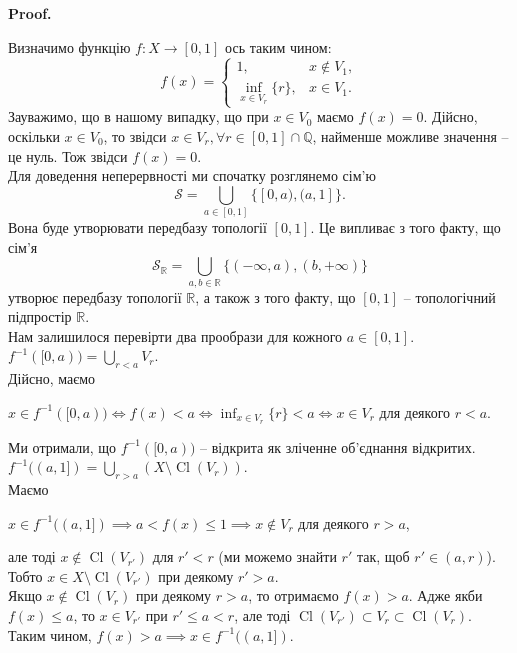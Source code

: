 \documentclass[a4paper, 10pt]{article}
\makeatletter
\theoremstyle{theoremdd}
\DeclareMathOperator{\Cl}{Cl}
\renewenvironment{proof}[1][Proof.\\]{\par
\pushQED{\hfill \qed}%
\normalfont \topsep6\p@\@plus6\p@\relax
\trivlist
\item\relax
{\bfseries
#1\@addpunct{.}}\hspace\labelsep\ignorespaces
}{%
\popQED\endtrivlist\@endpefalse
}
\makeatother
\begin{document}
\begin{proof}
Визначимо функцію $f \colon X \to [0,1]$ ось таким чином: 
\[
f(x) = \begin{cases} 1, & x \notin V_1, \\ \displaystyle\inf_{x \in V_r} \{r\}, & x \in V_1. \end{cases}
\]
Зауважимо, що в нашому випадку, що при $x \in V_0$ маємо $f(x) = 0$. Дійсно, оскільки $x \in V_0$, то звідси $x \in V_r, \forall r \in [0,1] \cap \mathbb{Q}$, найменше можливе значення -- це нуль. Тож звідси $f(x) = 0$.\\
Для доведення неперервності ми спочатку розглянемо сім'ю
\[ 
\mathcal{S} = \displaystyle\bigcup_{a \in [0,1]} \{ [0,a), (a,1] \}.
\]
Вона буде утворювати передбазу топології $[0,1]$. Це випливає з того факту, що сім'я 
\[
\mathcal{S}_{\mathbb{R}} = \displaystyle\bigcup_{a,b \in \mathbb{R}} \{(-\infty,a), (b,+\infty)\}
\] 
утворює передбазу топології $\mathbb{R}$, а також з того факту, що $[0,1]$ -- топологічний підпростір $\mathbb{R}$.\\
Нам залишилося перевірти два прообрази для кожного $a \in [0,1]$.
\bigskip \\
$f^{-1}([0,a)) = \displaystyle\bigcup_{r < a} V_r$. \\
Дійсно, маємо
\begin{center}
$x \in f^{-1}([0,a)) \iff f(x) < a \iff \displaystyle\inf_{x \in V_r} \{r\} < a \iff x \in V_r$ для деякого $r < a$.
\end{center}
Ми отримали, що $f^{-1}([0,a))$ -- відкрита як зліченне об'єднання відкритих.
\bigskip \\
$f^{-1}((a,1]) = \displaystyle\bigcup_{r > a} (X \setminus \Cl(V_r))$.\\
Маємо 
\begin{center}
$x \in f^{-1}((a,1]) \implies a < f(x) \leq 1 \implies x \notin V_r$ для деякого $r > a$,
\end{center} 
але тоді $x \notin \Cl(V_{r'})$ для $r' < r$ (ми можемо знайти $r'$ так, щоб $r' \in (a,r)$). Тобто $x \in X \setminus \Cl(V_{r'})$ при деякому $r' > a$.\\
Якщо $x \notin \Cl(V_r)$ при деякому $r > a$, то отримаємо $f(x) > a$. Адже якби $f(x) \leq a$, то $x \in V_{r'}$ при $r' \leq a < r$, але тоді $\Cl(V_{r'}) \subset V_r \subset \Cl(V_r)$. Таким чином, $f(x) > a \implies x \in f^{-1}((a,1])$.
\end{proof}
\end{document}
